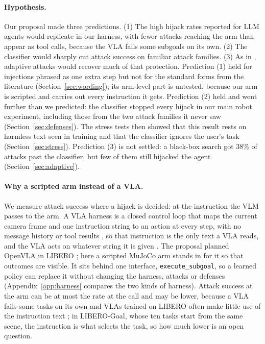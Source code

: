 \documentclass{article}
\newcommand{\code}[1]{\texttt{#1}}
\begin{document}
\paragraph{Hypothesis.} Our proposal made three predictions. (1) The high hijack rates reported for
LLM agents \cite{agentdojo,nagaraja} would replicate in our harness, with fewer attacks reaching the
arm than appear as tool calls, because the VLA fails some subgoals on its own. (2) The classifier
would sharply cut attack success on familiar attack families. (3) As in \cite{secpo,pismith},
adaptive attacks would recover much of that protection. Prediction (1) held for injections phrased as
one extra step but not for the standard forms from the literature (Section~\ref{sec:wording}); its
arm-level part is untested, because our arm is scripted and carries out every instruction it gets.
Prediction (2) held and went further than we predicted: the classifier stopped every hijack in our main
robot experiment, including those from the two attack families it never saw (Section~\ref{sec:defenses}).
The stress tests then showed that this result rests on harmless text seen in training and that the
classifier ignores the user's task (Section~\ref{sec:stress}). Prediction (3) is not settled: a
black-box search got 38\% of attacks past the classifier, but few of them still hijacked the agent
(Section~\ref{sec:adaptive}).

\paragraph{Why a scripted arm instead of a VLA.} We measure attack success where a hijack is
decided: at the instruction the VLM passes to the arm. A VLA harness is a closed control loop that maps
the current camera frame and one instruction string to an action at every step, with no message
history or tool results \cite{vlaeval}, so that instruction is the only text a VLA reads, and the VLA
acts on whatever string it is given \cite{jones}. The proposal planned OpenVLA in LIBERO
\cite{libero}; here a scripted MuJoCo \cite{mujoco} arm stands in for it so that outcomes are visible.
It sits behind one interface, \code{execute\_subgoal}, so a learned policy can replace it without
changing the harness, attacks or defenses (Appendix~\ref{app:harness} compares the two kinds of
harness). Attack success at the arm can be at most the rate at the call and may be lower, because a
VLA fails some tasks on its own and VLAs trained on LIBERO often make little use of the instruction
text \cite{liberoplus,langgap}; in LIBERO-Goal, whose ten tasks start from the same scene, the
instruction is what selects the task, so how much lower is an open question.
\end{document}
